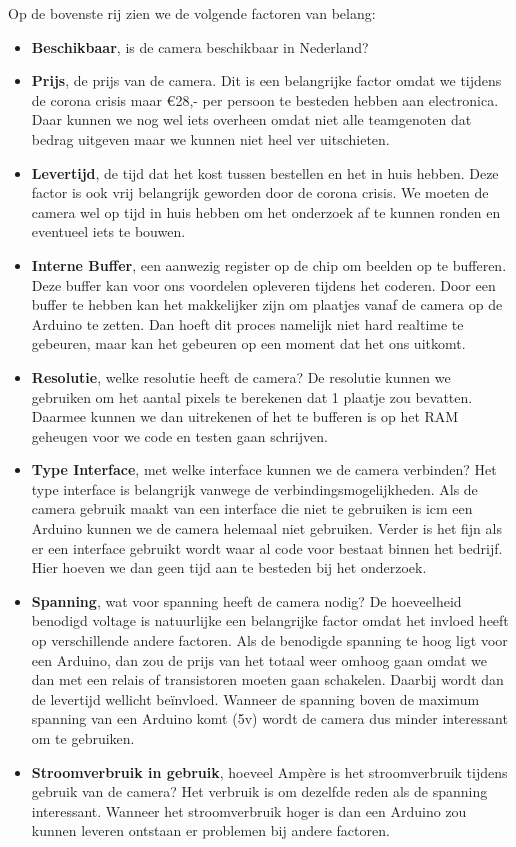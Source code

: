 \documentclass{article}
\begin{document}
Op de bovenste rij zien we de volgende factoren van belang:
\begin{itemize}
	\item \textbf{Beschikbaar}, is de camera beschikbaar in Nederland?
	\item \textbf{Prijs}, de prijs van de camera. Dit is een belangrijke factor omdat we tijdens de corona crisis maar \euro{}28,- per persoon te besteden hebben aan electronica. Daar kunnen we nog wel iets overheen omdat niet alle teamgenoten dat bedrag uitgeven maar we kunnen niet heel ver uitschieten.
	\item \textbf{Levertijd}, de tijd dat het kost tussen bestellen en het in huis hebben. Deze factor is ook vrij belangrijk geworden door de corona crisis. We moeten de camera wel op tijd in huis hebben om het onderzoek af te kunnen ronden en eventueel iets te bouwen.
	\item \textbf{Interne Buffer}, een aanwezig register op de chip om beelden op te bufferen. Deze buffer kan voor ons voordelen opleveren tijdens het coderen. Door een buffer te hebben kan het makkelijker zijn om plaatjes vanaf de camera op de Arduino te zetten. Dan hoeft dit proces namelijk niet hard realtime te gebeuren, maar kan het gebeuren op een moment dat het ons uitkomt.
	\item \textbf{Resolutie}, welke resolutie heeft de camera? De resolutie kunnen we gebruiken om het aantal pixels te berekenen dat 1 plaatje zou bevatten. Daarmee kunnen we dan uitrekenen of het te bufferen is op het RAM geheugen voor we code en testen gaan schrijven.
	\item \textbf{Type Interface},  met welke interface kunnen we de camera verbinden? Het type interface is belangrijk vanwege de verbindingsmogelijkheden. Als de camera gebruik maakt van een interface die niet te gebruiken is icm een Arduino kunnen we de camera helemaal niet gebruiken. Verder is het fijn als er een interface gebruikt wordt waar al code voor bestaat binnen het bedrijf. Hier hoeven we dan geen tijd aan te besteden bij het onderzoek.
	\item \textbf{Spanning}, wat voor spanning heeft de camera nodig? De hoeveelheid benodigd voltage is natuurlijke een belangrijke factor omdat het invloed heeft op verschillende andere factoren. Als de benodigde spanning te hoog ligt voor een Arduino, dan zou de prijs van het totaal weer omhoog gaan omdat we dan met een relais of transistoren moeten gaan schakelen. Daarbij wordt dan de levertijd wellicht beïnvloed. Wanneer de spanning boven de maximum spanning van een Arduino komt (5v) wordt de camera dus minder interessant om te gebruiken.
	\item \textbf{Stroomverbruik in gebruik}, hoeveel Ampère is het stroomverbruik tijdens gebruik van de camera? Het verbruik is om dezelfde reden als de spanning interessant. Wanneer het stroomverbruik hoger is dan een Arduino zou kunnen leveren ontstaan er problemen bij andere factoren.
\end{itemize}
\end{document}
